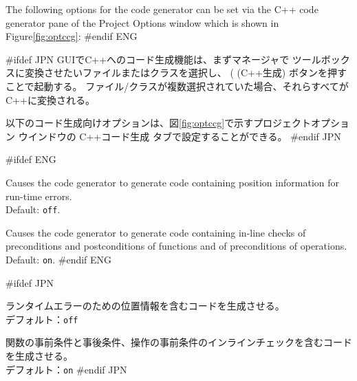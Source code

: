 \documentclass[\pformat,12pt]{article}
\newcommand{\guicmd}[1]{{\sf #1}}
\newcommand{\guicmd}[1]{{\gt #1}}
\begin{document}
The following options for the code generator can be set via the
\guicmd{C++ code generator} pane of the \guicmd{Project Options} window
which is shown in Figure\ref{fig:optccg}:
#endif ENG

#ifdef JPN
GUIでC++へのコード生成機能は、まずマネージャで
ツールボックスに変換させたいファイルまたはクラスを選択し、 
(
(\guicmd{C++生成}) ボタンを押すことで起動する。
ファイル/クラスが複数選択されていた場合、それらすべてがC++に変換される。

以下のコード生成向けオプションは、図\ref{fig:optccg}で示す\guicmd{プロジェクトオプション} ウインドウの
\guicmd{C++コード生成} タブで設定することができる。
#endif JPN

\begin{description}

#ifdef ENG
\item[Output position information] Causes the code
  generator to generate code containing position information for
  run-time errors. \\
  Default: \texttt{off}. 
\item[Check pre and post conditions] Causes the code
  generator to generate code containing in-line checks of
  preconditions and postconditions of functions and of preconditions
  of operations. \\
  Default: \texttt{on}. 
#endif ENG

#ifdef JPN
\item[位置情報を出力する]
  ランタイムエラーのための位置情報を含むコードを生成させる。 \\
  デフォルト：\texttt{off}
\item[事前／事後条件をチェックする]
  関数の事前条件と事後条件、操作の事前条件のインラインチェックを含むコードを生成させる。 \\
  デフォルト：\texttt{on}
#endif JPN

\end{description}
\end{document}
